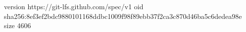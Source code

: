 version https://git-lfs.github.com/spec/v1
oid sha256:8ef3ef2bdc9880101168ddbc1009f98f89ebb37f2ca3c870d46ba5c6dedea98e
size 4606
